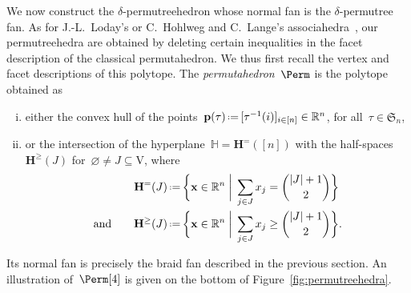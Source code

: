 \documentclass[ALCO]{cedram}
\newcommand{\R}{\mathbb{R}} %
\newcommand{\HH}{\mathbb{H}} %
\newcommand{\fS}{\mathfrak{S}} %
\renewcommand{\b}[1]{\mathbf{#1}} %
\newcommand{\biggset}[2]{\bigg\{ #1 \;\bigg|\; #2 \bigg\}} %
\newcommand{\eqdef}{\mbox{\,\raisebox{0.2ex}{\scriptsize\ensuremath{\mathrm:}}\ensuremath{=}\,}} %
\newcommand{\ground}{\mathrm{V}} %
\newcommand{\decoration}{\delta} %
\newcommand{\Hyp}{\b{H}^=} %
\newcommand{\HS}{\b{H}^\ge} %
\newcommand{\fref}[1]{Figure~\ref{#1}} %
\newcommand{\darkblue}{\color{darkblue}} %
\newcommand{\defn}[1]{\emph{\darkblue #1}} %
\begin{document}
We now construct the $\decoration$-permutreehedron whose normal fan is the $\decoration$-permutree fan. As for J.-L.~Loday's or C.~Hohlweg and C.~Lange's associahedra~\cite{Loday, HohlwegLange}, our permutreehedra are obtained by deleting certain inequalities in the facet description of the classical permutahedron. We thus first recall the vertex and facet descriptions of this polytope. The \defn{permutahedron}~$\Perm$ is the polytope obtained as
\begin{enumerate}[(i)]
\item either the convex hull of the points~$\b{p}(\tau) \eqdef [\tau^{-1}(i)]_{i \in [n]} \in \R^n$, for all~$\tau \in \fS_n$,
\item or the intersection of the hyperplane~$\HH = \Hyp([n])$ with the half-spaces~$\HS(J)$ for~$\varnothing \ne J \subseteq \ground$, where
\begin{align*}
\Hyp(J) & \eqdef \biggset{\b{x} \in \R^n}{\sum_{j \in J} x_j = \binom{|J|+1}{2}} \\\text{and} \qquad \HS(J) & \eqdef \biggset{\b{x} \in \R^n}{\sum_{j \in J} x_j \ge \binom{|J|+1}{2}}.
\end{align*}
\end{enumerate}
Its normal fan is precisely the braid fan described in the previous section. An illustration of~$\Perm[4]$ is given on the bottom of \fref{fig:permutreehedra}.
\end{document}
